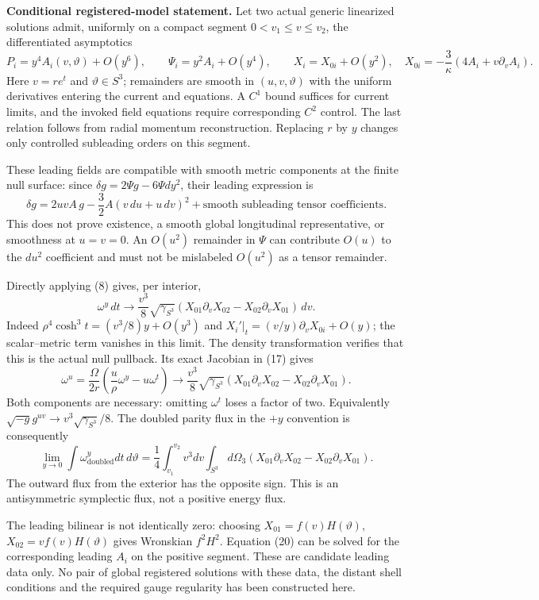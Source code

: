 \documentclass[
  11pt,
]{article}
\begin{document}
\textbf{Conditional registered-model statement.} Let two actual generic
linearized solutions admit, uniformly on a compact segment
\(0<v_1\le v\le v_2\), the differentiated asymptotics \[
 P_i=y^4 A_i(v,\vartheta)+O(y^6),\qquad
 \Psi_i=y^2 A_i+O(y^4),\qquad X_i=X_{0i}+O(y^2),
 \quad X_{0i}=-\frac3\kappa(4A_i+v\partial_vA_i).       \tag{20}
\] Here \(v=re^t\) and \(\vartheta\in S^3\); remainders are smooth in
\((u,v,\vartheta)\) with the uniform derivatives entering the current
and equations. A \(C^1\) bound suffices for current limits, and the
invoked field equations require corresponding \(C^2\) control. The last
relation follows from radial momentum reconstruction. Replacing \(r\) by
\(y\) changes only controlled subleading orders on this segment.

These leading fields are compatible with smooth metric components at the
finite null surface: since \(\delta g=2\Psi g-6\Psi dy^2\), their
leading expression is \[
 \delta g=2uvA\,g-\frac32A(v\,du+u\,dv)^2
          +\text{smooth subleading tensor coefficients}.        \tag{21}
\] This does not prove existence, a smooth global longitudinal
representative, or smoothness at \(u=v=0\). An \(O(u^2)\) remainder in
\(\Psi\) can contribute \(O(u)\) to the \(du^2\) coefficient and must
not be mislabeled \(O(u^2)\) as a tensor remainder.

Directly applying (8) gives, per interior, \[
 \omega^y\,dt\longrightarrow
 \frac{v^3}{8}\sqrt{\gamma_{S^3}}
 (X_{01}\partial_vX_{02}-X_{02}\partial_vX_{01})\,dv.   \tag{22}
\] Indeed \(\rho^4\cosh^3t=(v^3/8)y+O(y^3)\) and
\(X_i'|_t=(v/y)\partial_vX_{0i}+O(y)\); the scalar--metric term vanishes
in this limit. The density transformation verifies that this is the
actual null pullback. Its exact Jacobian in (17) gives \[
 \omega^u=\frac{\Omega}{2r}
 \left(\frac{u}{\rho}\omega^y-u\omega^t\right)
 \longrightarrow\frac{v^3}{8}\sqrt{\gamma_{S^3}}
 (X_{01}\partial_vX_{02}-X_{02}\partial_vX_{01}).        \tag{23}
\] Both components are necessary: omitting \(\omega^t\) loses a factor
of two. Equivalently \(\sqrt{-g}g^{uv}\to v^3\sqrt{\gamma_{S^3}}/8\).
The doubled parity flux in the \(+y\) convention is consequently \[
 \boxed{\lim_{y\to0}\int\omega^y_{\mathrm{doubled}}dt\,d\vartheta
 =\frac14\int_{v_1}^{v_2}v^3dv\int_{S^3}\!d\Omega_3
 (X_{01}\partial_vX_{02}-X_{02}\partial_vX_{01})}.       \tag{24}
\] The outward flux from the exterior has the opposite sign. This is an
antisymmetric symplectic flux, not a positive energy flux.

The leading bilinear is not identically zero: choosing
\(X_{01}=f(v)H(\vartheta)\), \(X_{02}=vf(v)H(\vartheta)\) gives
Wronskian \(f^2H^2\). Equation (20) can be solved for the corresponding
leading \(A_i\) on the positive segment. These are candidate leading
data only. No pair of global registered solutions with these data, the
distant shell conditions and the required gauge regularity has been
constructed here.
\end{document}
